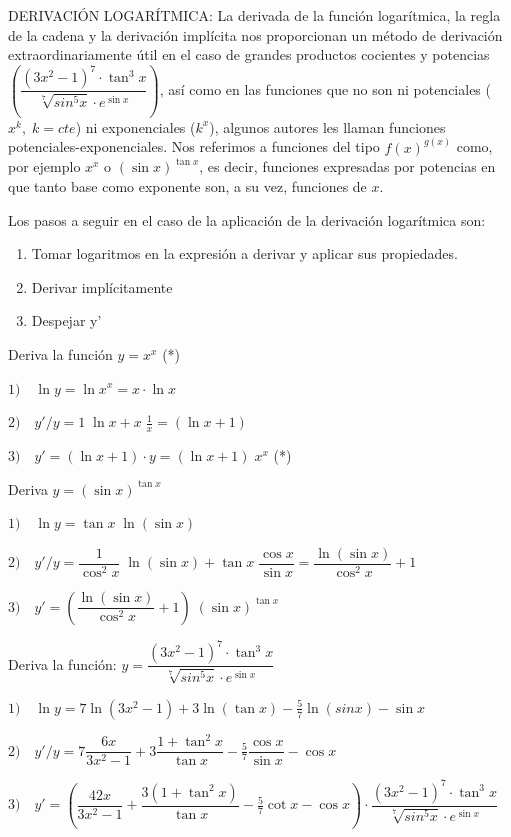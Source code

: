 	DERIVACIÓN LOGARÍTMICA: La derivada de la función logarítmica, la regla de la cadena y la derivación implícita nos proporcionan un método de derivación extraordinariamente útil en el caso de grandes productos cocientes y potencias $\left( \dfrac {(3x^2-1)^7 \cdot \tan^3 x}{\sqrt[7]{sin^5 x}\cdot e^{\sin x}} \right)$, así como en las funciones que no son ni potenciales ($x^k,\; k=cte$) ni exponenciales ($k^x$), algunos autores les llaman funciones potenciales-exponenciales. Nos referimos a funciones del tipo $f(x)^{g(x)}$ como, por ejemplo $x^x$ o $(\sin x)^{\tan x}$, es decir, funciones expresadas por potencias en que tanto base como exponente son, a su vez, funciones de $x$.
	
	Los pasos a seguir en el caso de la aplicación de la derivación logarítmica son:
	
	\begin{enumerate}
		\item Tomar logaritmos en la expresión a derivar y aplicar sus propiedades.
		\item Derivar implícitamente
		\item Despejar y'
	\end{enumerate}
	
	\begin{ejem} Deriva la función $y=x^x$ (*)
	
	$1) \quad \ln y = \ln x^x = x \cdot \ln x$
	
	$2) \quad y'/y= 1 \; \ln x + x \; \frac 1 x = (\ln x + 1)$
	
	$3) \quad y'=(\ln x + 1) \cdot y=(\ln x + 1)\; x^x$ (*)
		
	\end{ejem}
	
	\begin{ejem} Deriva $y=(\sin x)^{\tan x}$
	
	$1) \quad \ln y= \tan x \; \ln (\sin x)$
	
	$2) \quad y'/y= \dfrac 1 {\cos^2 x}\; \ln (\sin x) + \tan x\; \dfrac {\cos x}{\sin x} = \dfrac {\ln (\sin x)}{\cos^2 x} + 1$
	
	$3) \quad y'= \left( \dfrac {\ln (\sin x)}{\cos^2 x} + 1 \right) \; (\sin x)^{\tan x}$
		
	\end{ejem}
	
	\begin{ejem} Deriva la función: $y=\dfrac {(3x^2-1)^7 \cdot \tan^3 x}{\sqrt[7]{sin^5 x}\cdot e^{\sin x}}$
	
	
	$1) \quad \ln y= 7 \ln (3x^2-1) + 3 \ln (\tan x) - \frac 5 7 \ln (sin x) - \sin x$
	
	$2) \quad y'/y= 7 \dfrac {6x}{3x^2-1} + 3 \dfrac {1 + \tan^2 x}{\tan x} - \frac 5 7 \dfrac {\cos x}{\sin x}- \cos x$
	
	$3) \quad y'= \left(  \dfrac {42x}{3x^2-1} +  \dfrac {3(1 + \tan^2 x)}{\tan x} - \frac 5 7 \cot x- \cos x  \right) \cdot \dfrac {(3x^2-1)^7 \cdot \tan^3 x}{\sqrt[7]{sin^5 x}\cdot e^{\sin x}}$
		
	\end{ejem}

